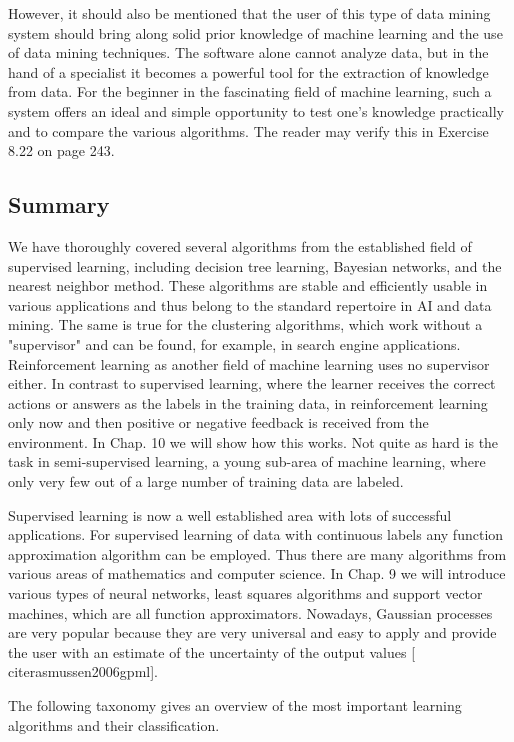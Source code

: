 \documentclass[10pt]{book}
\begin{document}
However, it should also be mentioned that the user of this type of data mining system should bring along solid prior knowledge of machine learning and the use of data mining techniques. The software alone cannot analyze data, but in the hand of a specialist it becomes a powerful tool for the extraction of knowledge from data. For the beginner in the fascinating field of machine learning, such a system offers an ideal and simple opportunity to test one's knowledge practically and to compare the various algorithms. The reader may verify this in Exercise 8.22 on page 243.

\subsection*{Summary}
We have thoroughly covered several algorithms from the established field of supervised learning, including decision tree learning, Bayesian networks, and the nearest neighbor method. These algorithms are stable and efficiently usable in various applications and thus belong to the standard repertoire in AI and data mining. The same is true for the clustering algorithms, which work without a "supervisor" and can be found, for example, in search engine applications. Reinforcement learning as another field of machine learning uses no supervisor either. In contrast to supervised learning, where the learner receives the correct actions or answers as the labels in the training data, in reinforcement learning only now and then positive or negative feedback is received from the environment. In Chap. 10 we will show how this works. Not quite as hard is the task in semi-supervised learning, a young sub-area of machine learning, where only very few out of a large number of training data are labeled.

Supervised learning is now a well established area with lots of successful applications. For supervised learning of data with continuous labels any function approximation algorithm can be employed. Thus there are many algorithms from various areas of mathematics and computer science. In Chap. 9 we will introduce various types of neural networks, least squares algorithms and support vector machines, which are all function approximators. Nowadays, Gaussian processes are very popular because they are very universal and easy to apply and provide the user with an estimate of the uncertainty of the output values [\\cite{rasmussen2006gpml}].

The following taxonomy gives an overview of the most important learning algorithms and their classification.\\
\end{document}
